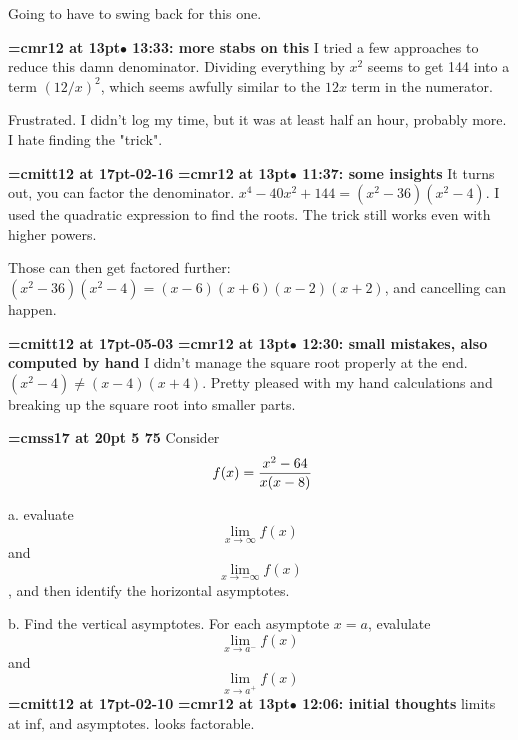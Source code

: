Going to have to swing back for this one.
\par

{\smallskip\noindent\bf\font\titlefont=cmr12 at 13pt\titlefont $\bullet$ 13:33: more stabs on this}\smallskip
I tried a few approaches to reduce this damn denominator. Dividing everything by $x^2$ seems to get 144 into a term $(12/x)^2$, which seems awfully similar to the $12x$ term in the numerator.
\par

Frustrated. I didn't log my time, but it was at least half an hour, probably more. I hate finding the "trick".
\par

{\medskip\noindent\bf\font\titlefont=cmitt12 at 17pt-02-16}\medskip
{\smallskip\noindent\bf\font\titlefont=cmr12 at 13pt\titlefont $\bullet$ 11:37: some insights}\smallskip
It turns out, you can factor the denominator. $x^4 - 40x^2 + 144 = (x^2 - 36)(x^2 -4)$. I used the quadratic expression to find the roots. The trick still works even with higher powers.
\par

Those can then get factored further: $(x^2 - 36)(x^2 -4) = (x - 6)(x+6)(x-2)(x+2)$, and cancelling can happen.
\par

{\medskip\noindent\bf\font\titlefont=cmitt12 at 17pt-05-03}\medskip
{\smallskip\noindent\bf\font\titlefont=cmr12 at 13pt\titlefont $\bullet$ 12:30: small mistakes, also computed by hand}\smallskip
I didn't manage the square root properly at the end. $(x^2-4) \ne (x -4)(x+4)$. Pretty pleased with my hand calculations and breaking up the square root into smaller parts.
\par

{\medskip\noindent\bf\font\titlefont=cmss17 at 20pt 5 75}\medskip
Consider
$$\
f(x) = {
x^2 - 64
\over
x(x - 8)
}
$$
\par a. evaluate $$\lim_{x \to \infty}{f(x)}$$ and
$$\lim_{x \to -\infty}{f(x)}$$, and then identify the horizontal
asymptotes.
\par b. Find the vertical asymptotes. For each asymptote $x = a$,
evalulate $$\lim_{x \to a^{-}}{f(x)}$$ and $$\lim_{x \to a^{+}}{f(x)}$$
{\medskip\noindent\bf\font\titlefont=cmitt12 at 17pt\titlefont 2026-02-10}\medskip
{\smallskip\noindent\bf\font\titlefont=cmr12 at 13pt\titlefont $\bullet$ 12:06: initial thoughts}\smallskip
limits at inf, and asymptotes. looks factorable.
\par

